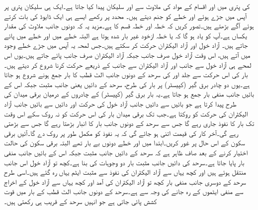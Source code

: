  کی پتری میں  اور  اقسام کے مواد کی ملاوٹ سے  اور  سلیکان پیدا کیا جاتا ہے۔ایک ہی سلیکان پتری پر آپس میں جڑے ہوئے  اور  خطے  کو جنم دیتے ہیں۔ محدد پر رکھے ایسے ہی ایک ڈایوڈ کی بات کرتے ہوئے آگے بڑھتے ہیں۔تصور کریں کہ  خطہ  اور  خطہ  قسم کا ہے۔مزید یہ کہ دونوں جانب ملاوٹ کی مقدار یکساں ہے۔آپ کو یاد ہو گا کہ  یا  خطہ ازخود غیر بار شدہ ہوتا ہے البتہ  خطے میں  اور  خطے میں  پائے جاتے ہیں۔ آزاد خول اور آزاد الیکٹران حرکت کر سکتے ہیں۔جس لمحہ یہ آپس میں جڑے خطے وجود میں آتے ہیں، اس وقت آزاد خول صرف  جانب جبکہ آزاد الیکٹران صرف  جانب پائے جاتے ہیں۔یوں اس لمحے ہی  آزاد خول  سے  جانب اور آزاد الیکٹران  سے  جانب   کے ذریعے حرکت کرنا شروع کر دیتے ہیں۔بار کی اس حرکت سے جلد  اور  کی سرحد کے دونوں جانب الٹ قطب کا بار جمع ہونے شروع ہو جاتا ہے۔یوں دو چادر برق گیر (کپیسٹر)  پر بار کی طرح، سرحد کے دائیں یعنی  جانب مثبت جبکہ اس کے بائیں جانب منفی بار جمع ہو جاتا ہے۔یہ بار برق گیر (کپیسٹر)  کے چادروں کے درمیان برقی میدان کی طرح  پیدا کرتا ہے جو بائیں سے دائیں جانب آزاد خول کی حرکت اور دائیں سے بائیں جانب آزاد الیکٹران کی حرکت  کو روکتا ہے۔جب تک برقی میدان  بار کی اس حرکت کو نہ روک سکے اس وقت تک بار کا نفوذ جاری رہے گا جس سے سرحد کے دونوں جانب بار کا انبار بڑھتا رہے گا جس سے  بڑھتی رہے گی۔آخر کار   کی قیمت اتنی ہو جائے گی کہ یہ نفوذ کو مکمل طور پر روک دے گا۔آئیں برقی سکون کے اس حال پر غور کریں۔ابتدا میں  اور  خطے دونوں بے بار تھے البتہ برقی سکون کی حالت اختیار کرنے کے بعد صاف ظاہر ہے کہ سرحد کے دائیں جانب مثبت جبکہ اس کے بائیں جانب منفی بار پایا جاتا ہے۔سرحد کی  دائیں جانب مثبت بار دو وجوہات کی بنا ہے۔کچھ تو آزاد خول اس جانب منتقل ہوئے ہیں اور کچھ یہاں سے آزاد الیکٹران کی نفوذ سے مثبت ایٹم یہاں رہ گئے ہیں۔اسی طرح سرحد کے دوسری جانب منفی بار کچھ تو آزاد الیکٹران کی آمد اور کچھ یہاں سے آزاد خول کے اخراج سے  منفی ایٹموں کے رہ جانے کی وجہ سے ہے۔سرحد کے دونوں جانب الٹ قطب کے بار میں قوت کشش پائی جاتی ہے جو انہیں سرحد کے قریب ہی رکھتی ہیں۔

